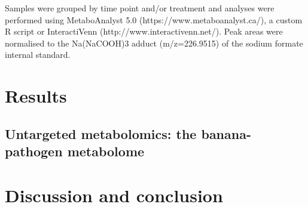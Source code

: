Samples were grouped by time point and/or treatment and analyses were performed using MetaboAnalyst 5.0 (https://www.metaboanalyst.ca/), a custom R script or InteractiVenn (http://www.interactivenn.net/). Peak areas were normalised to the Na(NaCOOH)3 adduct (m/z=226.9515) of the sodium formate internal standard. 

\section{Results}
\subsection{Untargeted metabolomics: the banana-pathogen metabolome}

\section{Discussion and conclusion}
